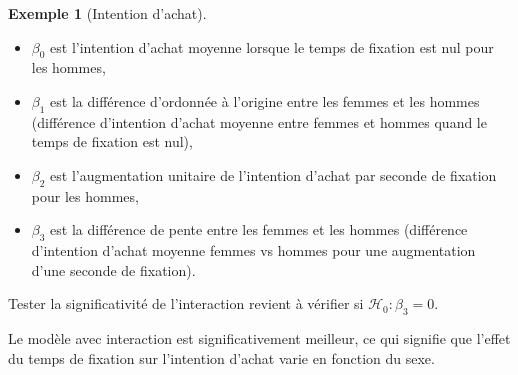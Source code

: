\documentclass[
  11pt,
  letterpaper,
]{scrbook}
\newenvironment{Shaded}{\begin{snugshade}}{\end{snugshade}}
\newcommand{\AttributeTok}[1]{\textcolor[rgb]{0.40,0.45,0.13}{#1}}
\newcommand{\CommentTok}[1]{\textcolor[rgb]{0.37,0.37,0.37}{#1}}
\newcommand{\FunctionTok}[1]{\textcolor[rgb]{0.28,0.35,0.67}{#1}}
\newcommand{\NormalTok}[1]{\textcolor[rgb]{0.00,0.23,0.31}{#1}}
\newcommand{\OtherTok}[1]{\textcolor[rgb]{0.00,0.23,0.31}{#1}}
\newcommand{\SpecialCharTok}[1]{\textcolor[rgb]{0.37,0.37,0.37}{#1}}
\newcommand{\StringTok}[1]{\textcolor[rgb]{0.13,0.47,0.30}{#1}}
\providecommand{\tightlist}{%
  \setlength{\itemsep}{0pt}\setlength{\parskip}{0pt}}\usepackage{longtable,booktabs,array}
\theoremstyle{plain}
\theoremstyle{plain}
\theoremstyle{definition}
\newtheorem{example}{Exemple}[chapter]
\theoremstyle{definition}
\theoremstyle{remark}
\begin{document}
\begin{example}[Intention
d'achat]
\begin{itemize}
\tightlist
\item
  \(\beta_0\) est l'intention d'achat moyenne lorsque le temps de
  fixation est nul pour les hommes,
\item
  \(\beta_1\) est la différence d'ordonnée à l'origine entre les femmes
  et les hommes (différence d'intention d'achat moyenne entre femmes et
  hommes quand le temps de fixation est nul),
\item
  \(\beta_2\) est l'augmentation unitaire de l'intention d'achat par
  seconde de fixation pour les hommes,
\item
  \(\beta_3\) est la différence de pente entre les femmes et les hommes
  (différence d'intention d'achat moyenne femmes vs hommes pour une
  augmentation d'une seconde de fixation).
\end{itemize}

Tester la significativité de l'interaction revient à vérifier si
\(\mathscr{H}_0: \beta_3=0.\)

\begin{Shaded}
\end{Shaded}

Le modèle avec interaction est significativement meilleur, ce qui
signifie que l'effet du temps de fixation sur l'intention d'achat varie
en fonction du sexe.

\end{example}
\end{document}
